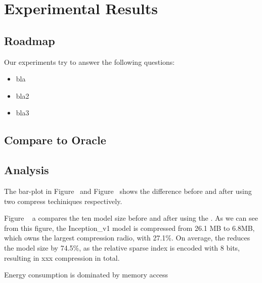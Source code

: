 \section{Experimental Results}


\subsection{Roadmap}
Our experiments try to answer the following questions:

\begin{itemize}
\item bla
\item bla2
\item bla3
\end{itemize}




\subsection{Compare to Oracle}


\subsection{Analysis}
The bar-plot in Figure~\cite{fig:analy_quan} and Figure~\cite{fig:analy_prun}
shows the difference before and after using two compress techiniques respectively.


Figure ~\cite{fig:analy_quan} a
compares the ten model size before and after using the \quantization.
As we can see from this figure, the Inception\_v1 model is
compressed from 26.1 MB to 6.8MB, which 
owns the largest compression radio, with 27.1\%.
On average, the \quantization reduces the model size by 74.5\%, 
as the relative sparse index is encoded with 8 bits, resulting in 
xxx compression in total.




Energy consumption is dominated by memory access

